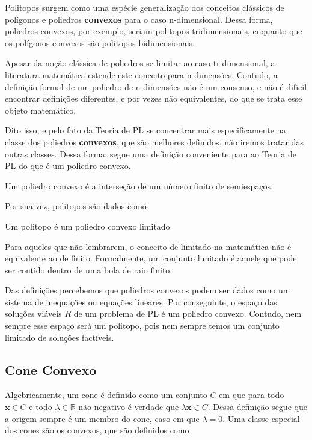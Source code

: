 Politopos surgem como uma espécie generalização dos conceitos clássicos de polígonos e poliedros \textbf{convexos} para o caso n-dimensional. Dessa forma, poliedros convexos, por exemplo, seriam politopos tridimensionais, enquanto que os polígonos convexos são politopos bidimensionais. 

Apesar da noção clássica de poliedros se limitar ao caso tridimensional, a literatura matemática estende este conceito para n dimensões. Contudo, a definição formal de um poliedro de n-dimensões não é um consenso, e não é difícil encontrar definições diferentes, e por vezes não equivalentes, do que se trata esse objeto matemático.

Dito isso, e pelo fato da Teoria de PL se concentrar mais especificamente na classe dos poliedros \textbf{convexos}, que são melhores definidos, não iremos tratar das outras classes. Dessa forma, segue uma definição conveniente para ao Teoria de PL do que é um poliedro convexo.

\begin{def:poliedro convexo}
	Um poliedro convexo é a interseção de um número finito de semiespaços.
\end{def:poliedro convexo}

Por sua vez, politopos são dados como

\begin{def:politopo}
	Um politopo é um poliedro convexo limitado
\end{def:politopo}

Para aqueles que não lembrarem, o conceito de limitado na matemática não é equivalente ao de finito. Formalmente, um conjunto limitado é aquele que pode ser contido dentro de uma bola de raio finito. 

Das definições percebemos que poliedros convexos podem ser dados como um sistema de inequações ou equações lineares. Por conseguinte, o espaço das soluções viáveis $R$ de um problema de PL é um poliedro convexo. Contudo, nem sempre esse espaço será um politopo, pois nem sempre temos um conjunto limitado de soluções factíveis.

\subsection{Cone Convexo}

Algebricamente, um cone é definido como um conjunto $C$ em que para todo $\mathbf{x} \in C$ e todo $\lambda \in \mathbb{R}$ não negativo é verdade que \(\lambda \mathbf{x} \in C\). Dessa definição segue que a origem sempre é um membro do cone, caso em que $\lambda = 0$. Uma classe especial dos cones são os convexos, que são definidos como

